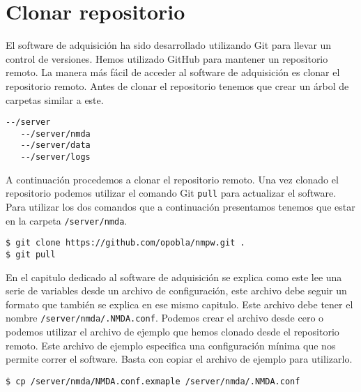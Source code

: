 	\section{Clonar repositorio}
		El software de adquisición ha sido desarrollado utilizando Git para llevar un control de versiones. Hemos utilizado GitHub para
		mantener un repositorio remoto. La manera más fácil de acceder al software de adquisición es clonar el repositorio remoto. Antes de
		clonar el repositorio tenemos que crear un árbol de carpetas similar a este.
		\begin{lstlisting}[style=myBash]
--/server
   --/server/nmda
   --/server/data
   --/server/logs
		\end{lstlisting}
		A continuación procedemos a clonar el repositorio remoto. Una vez clonado el repositorio podemos utilizar el comando Git \texttt{pull}
		para actualizar el software. Para utilizar los dos comandos que a continuación presentamos tenemos que estar en la carpeta
		\texttt{/server/nmda}.
		\begin{lstlisting}[style=myBash]
$ git clone https://github.com/opobla/nmpw.git .
$ git pull
		\end{lstlisting}
		En el capitulo dedicado al software de adquisición se explica como este lee una serie de variables desde un archivo de configuración,
		este archivo debe seguir un formato que también se explica en ese mismo capitulo. Este archivo debe tener el nombre
		\texttt{/server/nmda/.NMDA.conf}. Podemos crear el archivo desde cero o podemos utilizar el archivo de ejemplo que hemos clonado desde
		el repositorio remoto. Este archivo de ejemplo especifica una configuración mínima que nos permite correr el software. Basta con
		copiar el archivo de ejemplo para utilizarlo.
		\begin{lstlisting}[style=myBash]
$ cp /server/nmda/NMDA.conf.exmaple /server/nmda/.NMDA.conf
		\end{lstlisting}
